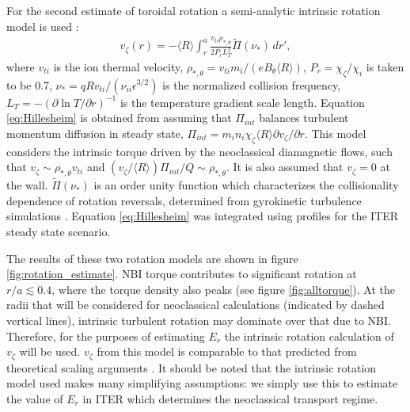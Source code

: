\documentclass{article}
\begin{document}
For the second estimate of toroidal rotation a semi-analytic intrinsic rotation model is used \cite{Hillesheim2015}:
\begin{gather}
v_{\zeta}(r) = - \langle R \rangle \int_{r}^a \frac{v_{ti} \rho_{*,\theta}} {2 P_r L_T^2} \widetilde{\Pi} (\nu_*) \, d r',
\end{gather} \label{eq:Hillesheim}
where $v_{ti}$ is the ion thermal velocity, $\rho_{*,\theta} = v_{ti} m_i/(e B_{\theta} \langle R \rangle) $, $P_r = \chi_{\zeta}/\chi_i$ is taken to be 0.7, $\nu_* = q R v_{ti}/(\nu_{ii} \epsilon^{3/2})$ is the normalized collision frequency, $L_T = - \left( \partial \ln T/ \partial r \right)^{-1}$ is the temperature gradient scale length. Equation \ref{eq:Hillesheim} is obtained from assuming that $\Pi_{int}$ balances turbulent momentum diffusion in steady state, $\Pi_{int} = m_i n_i \chi_{\zeta} \langle R \rangle \partial v_{\zeta}/\partial r$. This model considers the intrinsic torque driven by the neoclassical diamagnetic flows, such that $v_{\zeta} \sim \rho_{*,\theta} v_{ti}$ and $(v_{\zeta}/\langle R \rangle) \Pi_{int}/Q \sim \rho_{*, \theta}$. It is also assumed that $v_{\zeta} = 0$ at the wall. %
$\widetilde{\Pi} (\nu_*)$ is an order unity function which characterizes the collisionality dependence of rotation reversals, determined from gyrokinetic turbulence simulations \cite{Barnes2013}. Equation \ref{eq:Hillesheim} was integrated using profiles for the ITER steady state scenario. 

The results of these two rotation models are shown in figure \ref{fig:rotation_estimate}. NBI torque contributes to significant rotation at $r/a \lesssim 0.4$, where the torque density also peaks (see figure \ref{fig:alltorque}).  At the radii that will be considered for neoclassical calculations (indicated by dashed vertical lines), intrinsic turbulent rotation may dominate over that due to NBI. Therefore, for the purposes of estimating $E_r$ the intrinsic rotation calculation of $v_{\zeta}$ will be used. $v_{\zeta}$ from this model is comparable to that predicted from theoretical scaling arguments \cite{Parra2012}. It should be noted that the intrinsic rotation model used makes many simplifying assumptions: we simply use this to estimate the value of $E_r$ in ITER which determines the neoclassical transport regime. 

\FloatBarrier
\end{document}
